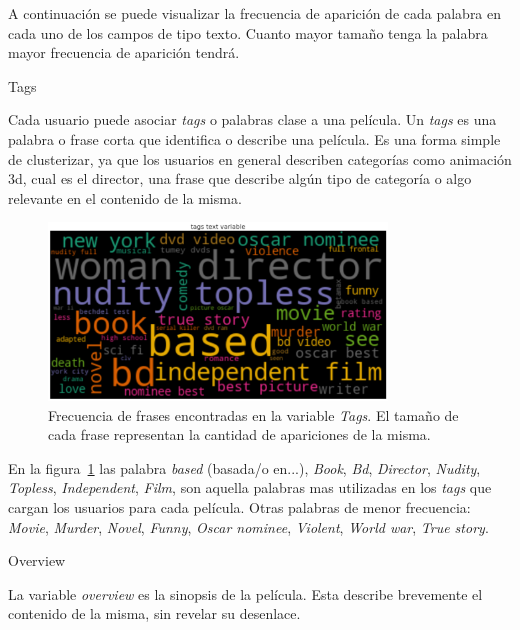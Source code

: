 \documentclass[11pt,a4paper,twoside]{thesis}
\begin{document}
A continuación se puede visualizar la frecuencia de aparición de cada palabra
en cada uno de los campos de tipo texto. Cuanto mayor tamaño tenga la palabra
mayor frecuencia de aparición tendrá.

\begin{description}
	\item[Tags]
\end{description}

Cada usuario puede asociar \textit{tags} o palabras clase a una película. Un
\textit{tags} es una palabra o frase corta que identifica o describe una
película. Es una forma simple de clusterizar, ya que los usuarios en general
describen categorías como animación 3d, cual es el director, una frase que
describe algún tipo de categoría o algo relevante en el contenido de la misma.

\begin{figure}[h!]
	\centering
	\includegraphics[width=9cm]{./images/Cloud-tags.png}
	\caption{Frecuencia de frases encontradas en la variable \textit{Tags}. El tamaño de cada frase representan la cantidad de apariciones de la misma.}
	\label{fig:tagsCloud}
\end{figure}

En la figura~\ref{fig:tagsCloud} las palabra \textit{based} (basada/o en...),
\textit{Book}, \textit{Bd}, \textit{Director}, \textit{Nudity},
\textit{Topless}, \textit{Independent}, \textit{Film}, son aquella palabras mas
utilizadas en los \textit{tags} que cargan los usuarios para cada película.
Otras palabras de menor frecuencia: \textit{Movie}, \textit{Murder},
\textit{Novel}, \textit{Funny}, \textit{Oscar nominee}, \textit{Violent},
\textit{World war}, \textit{True story}.

\clearpage

\begin{description}
	\item[Overview]
\end{description}

La variable \textit{overview} es la sinopsis de la película. Esta describe
brevemente el contenido de la misma, sin revelar su desenlace.
\end{document}
